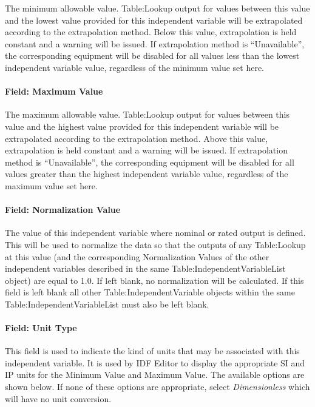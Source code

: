The minimum allowable value. Table:Lookup output for values between this
value and the lowest value provided for this independent variable will
be extrapolated according to the extrapolation method. Below this value,
extrapolation is held constant and a warning will be issued. If
extrapolation method is ``Unavailable'', the corresponding equipment
will be disabled for all values less than the lowest independent
variable value, regardless of the minimum value set here.

\paragraph{Field: Maximum Value}\label{field-maximum-value}

The maximum allowable value. Table:Lookup output for values between this
value and the highest value provided for this independent variable will
be extrapolated according to the extrapolation method. Above this value,
extrapolation is held constant and a warning will be issued. If
extrapolation method is ``Unavailable'', the corresponding equipment
will be disabled for all values greater than the highest independent
variable value, regardless of the maximum value set here.

\paragraph{Field: Normalization
Value}\label{field-normalization-value}

The value of this independent variable where nominal or rated output is
defined. This will be used to normalize the data so that the outputs of
any Table:Lookup at this value (and the corresponding Normalization
Values of the other independent variables described in the same
Table:IndependentVariableList object) are equal to 1.0. If left blank, no
normalization will be calculated. If this field is left blank all other
Table:IndependentVariable objects within the same Table:IndependentVariableList
must also be left blank.

\paragraph{Field: Unit Type}\label{field-unit-type}

This field is used to indicate the kind of units that may be associated
with this independent variable. It is used by IDF Editor to display the
appropriate SI and IP units for the Minimum Value and Maximum Value. The
available options are shown below. If none of these options are
appropriate, select \emph{Dimensionless} which will have no unit
conversion.

